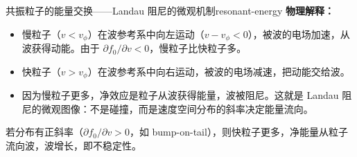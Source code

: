 \begin{example}{共振粒子的能量交换——Landau 阻尼的微观机制}{resonant-energy}
\textbf{物理解释：}
\begin{itemize}[leftmargin=*,itemsep=0pt]
\item 慢粒子（$v < v_\phi$）在波参考系中向左运动（$v-v_\phi<0$），被波的电场加速，从波获得动能。由于 $\partial f_0/\partial v<0$，慢粒子比快粒子多。
\item 快粒子（$v > v_\phi$）在波参考系中向右运动，被波的电场减速，把动能交给波。
\item 因为慢粒子更多，净效应是粒子从波获得能量，波被阻尼。这就是 Landau 阻尼的微观图像：不是碰撞，而是速度空间分布的斜率决定能量流向。
\end{itemize}

若分布有正斜率（$\partial f_0/\partial v>0$，如 bump-on-tail），则快粒子更多，净能量从粒子流向波，波增长，即不稳定性。
\end{example}

